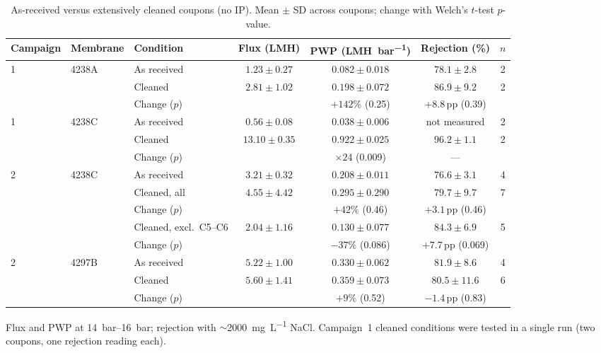 \begin{table}[htbp]
  \centering
  \caption{As-received versus extensively cleaned coupons (no IP). Mean $\pm$ SD across coupons; change with Welch's $t$-test $p$-value.}
  \label{tab:clean-compare}
  \small
  \begin{tabular}{lllccc c}
    \toprule
    Campaign & Membrane & Condition & Flux (\unit{LMH}) & PWP (\unit{LMH.bar^{-1}}) & Rejection (\%) & $n$ \\
    \midrule
    1 & 4238A & As received & $1.23 \pm 0.27$ & $0.082 \pm 0.018$ & $78.1 \pm 2.8$ & 2 \\
      &       & Cleaned     & $2.81 \pm 1.02$ & $0.198 \pm 0.072$ & $86.9 \pm 9.2$ & 2 \\
      &       & Change ($p$) & & $+142\%$ (0.25) & $+8.8$\,pp (0.39) & \\
    \midrule
    1 & 4238C & As received & $0.56 \pm 0.08$ & $0.038 \pm 0.006$ & not measured & 2 \\
      &       & Cleaned     & $13.10 \pm 0.35$ & $0.922 \pm 0.025$ & $96.2 \pm 1.1$ & 2 \\
      &       & Change ($p$) & & $\times 24$ (0.009) & --- & \\
    \midrule
    2 & 4238C & As received & $3.21 \pm 0.32$ & $0.208 \pm 0.011$ & $76.6 \pm 3.1$ & 4 \\
      &       & Cleaned, all & $4.55 \pm 4.42$ & $0.295 \pm 0.290$ & $79.7 \pm 9.7$ & 7 \\
      &       & Change ($p$) & & $+42\%$ (0.46) & $+3.1$\,pp (0.46) & \\
      &       & Cleaned, excl.\ C5--C6 & $2.04 \pm 1.16$ & $0.130 \pm 0.077$ & $84.3 \pm 6.9$ & 5 \\
      &       & Change ($p$) & & $-37\%$ (0.086) & $+7.7$\,pp (0.069) & \\
    \midrule
    2 & 4297B & As received & $5.22 \pm 1.00$ & $0.330 \pm 0.062$ & $81.9 \pm 8.6$ & 4 \\
      &       & Cleaned     & $5.60 \pm 1.41$ & $0.359 \pm 0.073$ & $80.5 \pm 11.6$ & 6 \\
      &       & Change ($p$) & & $+9\%$ (0.52) & $-1.4$\,pp (0.83) & \\
    \bottomrule
  \end{tabular}
  \par\smallskip
  \footnotesize Flux and PWP at \qtyrange{14}{16}{bar}; rejection with $\sim$\qty{2000}{mg.L^{-1}} NaCl. Campaign~1 cleaned conditions were tested in a single run (two coupons, one rejection reading each).
\end{table}

